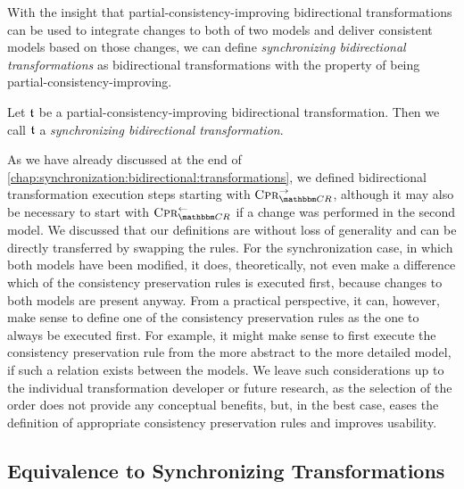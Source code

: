 With the insight that partial-consistency-improving bidirectional transformations can be used to integrate changes to both of two models and deliver consistent models based on those changes, we can define \emph{synchronizing bidirectional transformations} as bidirectional transformations with the property of being partial-consistency-improving.

\begin{definition}
    Let $\mathfrak{t}$ be a partial-consistency-improving bidirectional transformation.
    Then we call $\mathfrak{t}$ a \emph{synchronizing bidirectional transformation}.
\end{definition}

As we have already discussed at the end of \autoref{chap:synchronization:bidirectional:transformations}, we defined bidirectional transformation execution steps starting with $\consistencypreservationrule{\consistencyrelationset{CR}}^{\rightarrow}$, although it may also be necessary to start with $\consistencypreservationrule{\consistencyrelationset{CR}}^{\leftarrow}$ if a change was performed in the second model.
We discussed that our definitions are without loss of generality and can be directly transferred by swapping the rules.
For the synchronization case, in which both models have been modified, it does, theoretically, not even make a difference which of the consistency preservation rules is executed first, because changes to both models are present anyway.
From a practical perspective, it can, however, make sense to define one of the consistency preservation rules as the one to always be executed first.
For example, it might make sense to first execute the consistency preservation rule from the more abstract to the more detailed model, if such a relation exists between the models.
We leave such considerations up to the individual transformation developer or future research, as the selection of the order does not provide any conceptual benefits, but, in the best case, eases the definition of appropriate consistency preservation rules and improves usability.


\subsection{Equivalence to Synchronizing Transformations}


